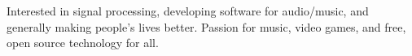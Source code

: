 \documentclass[letter,10pt]{article}
\begin{document}


Interested in signal processing, developing software for audio/music, and generally making people's lives better. Passion for music, video games, and free, open source technology for all.
\end{document}
